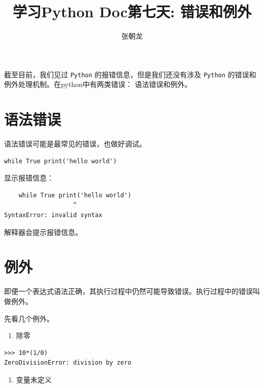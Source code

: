 \documentclass[10pt,a4paper,UTF8]{article}
\author{张朝龙}
\date{}
\title{学习Python Doc第七天: 错误和例外}
\begin{document}
\maketitle
\tableofcontents
{}
截至目前，我们见过 \texttt{Python} 的报错信息，但是我们还没有涉及 \texttt{Python} 的错误和例外处理机制。在python中有两类错误： 语法错误和例外。

\section{语法错误}
\label{sec:org1e36fdb}


语法错误可能是最常见的错误，也做好调试。
\lstset{language=Python,label= ,caption= ,captionpos=b,numbers=none}
\begin{lstlisting}
while True print('hello world')
\end{lstlisting}

显示报错信息：
\begin{verbatim}
    while True print('hello world')
                   ^
SyntaxError: invalid syntax
\end{verbatim}
解释器会提示报错信息。
\section{例外}
\label{sec:org6fe6da7}


即便一个表达式语法正确，其执行过程中仍然可能导致错误。执行过程中的错误叫做例外。

先看几个例外。
\begin{enumerate}
\item 除零
\end{enumerate}
\begin{verbatim}
>>> 10*(1/0)
ZeroDivisionError: division by zero
\end{verbatim}
\begin{enumerate}
\item 变量未定义
\end{enumerate}
\end{document}
